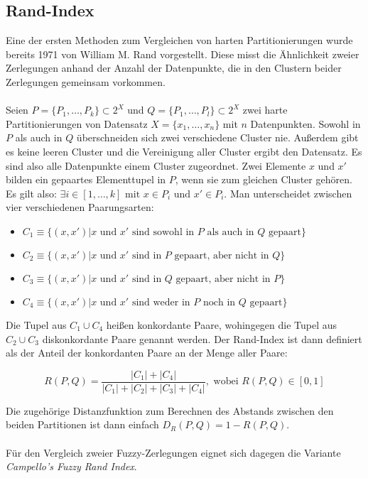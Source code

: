 \documentclass[11pt,ceqn]{book}
\begin{document}
\subsection{Rand-Index}
Eine der ersten Methoden zum Vergleichen von harten Partitionierungen wurde bereits 1971 von William M. Rand \cite{rand} vorgestellt. Diese misst die Ähnlichkeit zweier Zerlegungen anhand der Anzahl der Datenpunkte, die in den Clustern beider Zerlegungen gemeinsam vorkommen. \\~\\
Seien $P = \{P_1, \dots, P_k\} \subset 2^X$ und  $Q = \{P_1, \dots, P_l\} \subset 2^X$ zwei harte Partitionierungen von Datensatz $X=\{x_1,\dots,x_n\}$ mit $n$ Datenpunkten. Sowohl in $P$ als auch in $Q$ überschneiden sich zwei verschiedene Cluster nie. Außerdem gibt es keine leeren Cluster und die Vereinigung aller Cluster ergibt den Datensatz. Es sind also alle Datenpunkte einem Cluster zugeordnet. Zwei Elemente $x$ und $x'$ bilden ein gepaartes Elementtupel in $P$, wenn sie zum gleichen Cluster gehören. Es gilt also: $\exists i \in \left[1,\dots,k\right] \text{ mit } x \in P_i \text{ und } x' \in P_i$. Man unterscheidet zwischen vier verschiedenen Paarungsarten:

\begin{itemize}
\item $C_1 \equiv \{(x,x')|  x \text{ und } x' \text{ sind sowohl in } P \text{ als auch in } Q \text{ gepaart}\}$
\item $C_2 \equiv \{(x,x')|  x \text{ und } x' \text{ sind in } P \text{ gepaart, aber nicht in } Q\}$
\item $C_3 \equiv \{(x,x')| x \text{ und } x' \text{ sind in } Q \text{ gepaart, aber nicht in } P\}$
\item $C_4 \equiv \{(x,x')|  x \text{ und } x' \text{ sind weder in } P \text{ noch in } Q \text{ gepaart}\}$
\end{itemize}

Die Tupel aus $C_1 \cup C_4$ heißen konkordante Paare, wohingegen die Tupel aus $C_2 \cup C_3$ diskonkordante Paare genannt werden. Der Rand-Index ist dann definiert als der Anteil der konkordanten Paare an der Menge aller Paare:

$$R(P,Q) = \frac{|C_1|+|C_4|}{|C_1|+|C_2|+|C_3|+|C_4|}, \text{ wobei } R(P,Q) \in \left[0,1 \right]$$

Die zugehörige Distanzfunktion zum Berechnen des Abstands zwischen den beiden Partitionen ist dann einfach $D_R(P,Q) = 1-R(P,Q)$.
\\~\\
Für den Vergleich zweier Fuzzy-Zerlegungen eignet sich dagegen die Variante \textit{Campello's Fuzzy Rand Index}.
\end{document}
